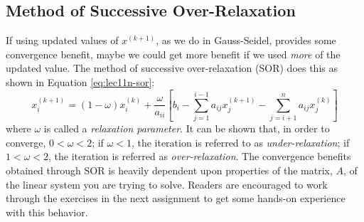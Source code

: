 \subsection{Method of Successive Over-Relaxation}
If using updated values of $x^{(k+1)}$, as we do in Gauss-Seidel, provides some convergence benefit, maybe we could get more benefit if we used \emph{more} of the updated value.  The method of successive over-relaxation (SOR) does this as shown in Equation \ref{eq:lec11n-sor}:
\begin{equation}
x_{i}^{(k+1)} = (1-\omega) x_{i}^{(k)} + \frac{\omega}{a_{ii}}\left[b_{i} - \sum\limits_{j=1}^{i-1}a_{ij}x_{j}^{(k+1)} - \sum\limits_{j=i+1}^{n}a_{ij}x_j^{(k)} \right]
\label{eq:lec11n-sor}
\end{equation}
where $\omega$ is called a \emph{relaxation parameter}.  It can be shown that, in order to converge, $0 < \omega < 2$; if $\omega<1$, the iteration is referred to as \emph{under-relaxation}; if $1 < \omega < 2$, the iteration is referred as \emph{over-relaxation}.  The convergence benefits obtained through SOR is heavily dependent upon properties of the matrix, $A$, of the linear system you are trying to solve.  Readers are encouraged to work through the exercises in the next assignment to get some hands-on experience with this behavior.  
